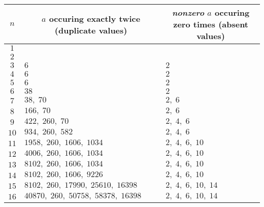 \documentclass[1gpt]{article}
\theoremstyle{break}
\begin{document}
\begin{itemize}
        \begin{table}[h]
            \centering
            \begin{tabular}{|c|l|l|}
                \hline
                \multicolumn{1}{|c|}{$n$} & \multicolumn{1}{|c|}{$a$ occuring exactly twice (duplicate values)} & \multicolumn{1}{|c|}{\emph{nonzero} $a$ occuring zero times (absent values)} \\
                \hline
                $1$  &                                                       & \\
                $2$  &                                                       & \\
                $3$  & $6$                                                   & $2$ \\
                $4$  & $6$                                                   & $2$ \\
                $5$  & $6$                                                   & $2$ \\
                $6$  & $38$                                                  & $2$ \\
                $7$  & $38,\; 70$                                              & $2,\; 6$ \\
                $8$  & $166,\; 70$                                             & $2,\; 6$ \\
                $9$  & $422,\; 260,\; 70$                                        & $2,\; 4,\; 6$ \\
                $10$ & $934,\; 260,\; 582$                                       & $2,\; 4,\; 6$ \\
                $11$ & $1958,\; 260,\; 1606,\; 1034$                               & $2,\; 4,\; 6,\; 10$ \\
                $12$ & $4006,\; 260,\; 1606,\; 1034$                               & $2,\; 4,\; 6,\; 10$ \\
                $13$ & $8102,\; 260,\; 1606,\; 1034$                               & $2,\; 4,\; 6,\; 10$ \\
                $14$ & $8102,\; 260,\; 1606,\; 9226$                               & $2,\; 4,\; 6,\; 10$ \\
                $15$ & $8102,\; 260,\; 17990,\; 25610,\; 16398$                      & $2,\; 4,\; 6,\; 10,\; 14$ \\
                $16$ & $40870,\; 260,\; 50758,\; 58378,\; 16398$                     & $2,\; 4,\; 6,\; 10,\; 14$ \\

\end{tabular}
\end{table}
\end{itemize}
\end{document}
